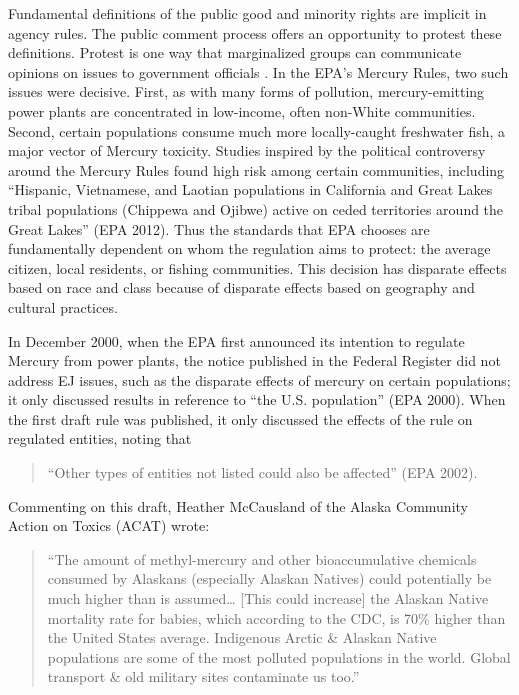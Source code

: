 \documentclass[
      12pt,
        ]{article}
\begin{document}
Fundamental definitions of the public good and minority rights are
implicit in agency rules. The public comment process offers an
opportunity to protest these definitions. Protest is one way that
marginalized groups can communicate opinions on issues to government
officials \citep{Gillion2013}. In the EPA's Mercury Rules, two
such issues were decisive. First, as with many forms of pollution,
mercury-emitting power plants are concentrated in low-income, often
non-White communities. Second, certain populations consume much more
locally-caught freshwater fish, a major vector of Mercury toxicity.
Studies inspired by the political controversy around the Mercury Rules
found high risk among certain communities, including ``Hispanic, Vietnamese, and
Laotian populations in California and Great Lakes tribal populations
(Chippewa and Ojibwe) active on ceded territories around the Great
Lakes'' (EPA 2012). Thus the standards that EPA chooses are fundamentally
dependent on whom the regulation aims to protect: the average citizen,
local residents, or fishing communities. This decision has disparate
effects based on race and class because of disparate effects based on
geography and cultural practices.

In December 2000, when the EPA first announced its intention to regulate
Mercury from power plants, the notice published in the Federal Register
did not address EJ issues, such as the disparate
effects of mercury on certain populations; it only discussed results in
reference to ``the U.S. population'' (EPA 2000). When the first draft rule
was published, it only discussed the effects of the rule on regulated
entities, noting that

\begin{quote}
``Other types of entities not listed could also be
affected'' (EPA 2002).
\end{quote}

Commenting on this draft, Heather McCausland of
the Alaska Community Action on Toxics (ACAT) wrote:

\begin{quote}
``The amount of methyl-mercury and other bioaccumulative chemicals
consumed by Alaskans (especially Alaskan Natives) could potentially be
much higher than is assumed\ldots{} {[}This could increase{]} the Alaskan Native mortality rate for
babies, which according to the CDC, is 70\% higher than the United States
average. Indigenous Arctic \& Alaskan Native populations are some of
the most polluted populations in the world.
Global transport \& old military sites contaminate us too.''
\end{quote}
\end{document}
